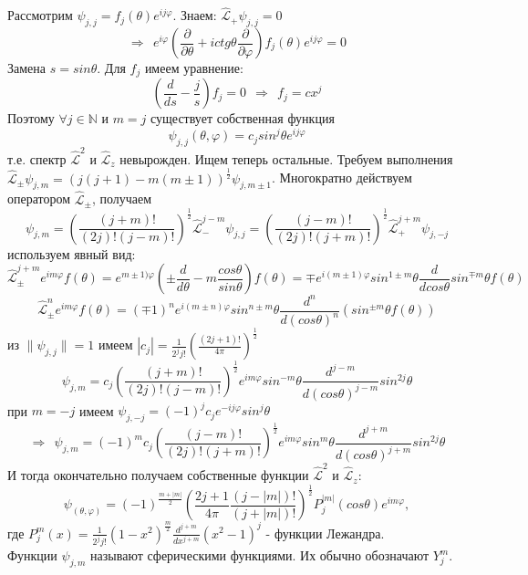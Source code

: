 	Рассмотрим $\psi_{j,j} = f_j(\theta)e^{ij\varphi}$. Знаем: $\hat{\mathcal{L}}_{+}\psi_{j,j} = 0$
	$$
		\Rightarrow \ \ e^{i\varphi}\left(\frac{\partial}{\partial\theta} + ictg\theta\frac{\partial}{\partial\varphi}\right)f_j(\theta)e^{ij\varphi} = 0
	$$
	Замена $s = sin\theta$. Для $f_j$ имеем уравнение:
	$$
		\left(\frac{d}{ds}-\frac{j}{s}\right)f_j = 0 \ \ \Rightarrow \ \ f_j = cx^j
	$$
	Поэтому $\forall j \in\mathbb{N}$ и $m = j$ существует собственная функция 
	$$
		\psi_{j,j} (\theta,\varphi) = c_j sin^j\theta e^{ij\varphi}
	$$
	т.е. спектр $\hat{\mathcal{L}}^2$ и $\hat{\mathcal{L}}_z$ невырожден. Ищем теперь остальные. Требуем выполнения $\hat{\mathcal{L}}_{\pm}\psi_{j,m} = (j(j + 1)-m(m\pm1))^{\frac{1}{2}}\psi_{j,m\pm1}$. Многократно действуем оператором $\hat{\mathcal{L}}_{\pm}$, получаем 
	$$
		\psi_{j,m} = \left(\frac{(j + m)!}{(2j)!(j-m)!}\right)^{\frac{1}{2}}\hat{\mathcal{L}}^{j-m}_{-}\psi_{j,j} = \left(\frac{(j - m)!}{(2j)!(j+m)!}\right)^{\frac{1}{2}}\hat{\mathcal{L}}^{j+m}_{+}\psi_{j,-j}
	$$
	используем явный вид:
	$$
		\hat{\mathcal{L}}^{j+m}_{\pm}e^{im\varphi}f(\theta) = e^{m\pm1)\varphi}\left(\pm\frac{d}{d\theta}-m\frac{cos\theta}{sin\theta}\right)f(\theta) = \mp e^{i(m\pm1)\varphi}sin^{1\pm m}\theta \frac{d}{dcos\theta}sin^{\mp m}\theta f(\theta)
	$$
	$$
		\hat{\mathcal{L}}^{n}_{\pm} e^{im\varphi}f(\theta)=(\mp1)^ne^{i(m\pm n)\varphi}sin^{n\pm m}\theta \frac{d^n}{d(cos\theta)^n}(sin^{\pm m}\theta f(\theta))
	$$
	из $\|\psi_{j,j}\|=1$ имеем $|c_j| = \frac{1}{2^jj!}\left(\frac{(2j+1)!}{4\pi}\right)^{\frac{1}{2}}$
	$$
		\psi_{j,m} = c_j\left(\frac{(j + m)!}{(2j)!(j-m)!}\right)^{\frac{1}{2}}e^{im\varphi}sin^{-m}\theta\frac{d^{j-m}}{d(cos\theta)^{j-m}}sin^{2j}\theta
	$$
	при $m = -j$ имеем $\psi_{j,-j} = (-1)^jc_je^{-ij\varphi}sin^j\theta$
	$$
		\Rightarrow \ \ \psi_{j,m} = (-1)^mc_j\left(\frac{(j-m)!}{(2j)!(j+m)!}\right)^{\frac{1}{2}}e^{im\varphi}sin^m\theta\frac{d^{j+m}}{d(cos\theta)^{j+m}}sin^{2j}\theta
	$$
	И тогда окончательно получаем собственные функции $\hat{\mathcal{L}}^2$ и $\hat{\mathcal{L}}_z$:
	$$
		\psi_(\theta,\varphi) = (-1)^{\frac{m+|m|}{2}}\left(\frac{2j+1}{4\pi}\frac{(j-|m|)!}{(j+|m|)!}\right)^{\frac{1}{2}}P^{|m|}_j(cos\theta)e^{im\varphi},
	$$
	где $P^m_j(x) = \frac{1}{2^jj!}(1-x^2)^{\frac{m}{2}}\frac{d^{j+m}}{dx^{j+m}}(x^2-1)^j$ - функции Лежандра.\\
	Функции $\psi_{j,m}$ называют сферическими функциями. Их обычно обозначают $Y^m_j$.
